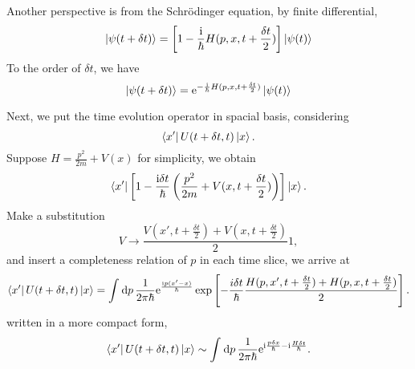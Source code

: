 Another perspective is from the Schr\"odinger equation, by finite differential,
\begin{equation}
  \ket{\psi(t+\delta t)} = \left[ 1- \frac{\mathrm{i} }{\hbar}H(p, x, t+ \frac{\delta t}{2}) \right] \ket{\psi(t)}
\end{equation}
To the order of $\delta t$, we have 
\begin{equation}
    \ket{\psi(t+\delta t)} = \mathrm{e}^{- \frac{\mathrm{i} }{\hbar}H(p,x,t+ \frac{\delta t}{2})} \ket{\psi(t)}
\end{equation}

Next, we put the time evolution operator in spacial basis, considering
\begin{equation}
  \bra{x'}U(t+\delta t,t)\ket{x}.
\end{equation}
Suppose $H = \frac{p^{2}}{2m}+ V(x)$ for simplicity, we obtain
\begin{equation}
  \bra{x'}\left[ 1- \frac{\mathrm{i}  \delta t}{\hbar}\left( \frac{p^{2}}{2m} + V(x, t+ \frac{\delta t}{2}) \right)  \right] \ket{x}.
\end{equation}
Make a substitution
\begin{equation}
  V \rightarrow \frac{V(x',t+ \frac{\delta t}{2})+ V(x, t+\frac{\delta t}{2})}{2} 1,
\end{equation}
and insert a completeness relation of $p$ in each time slice, we arrive at
\begin{equation}
    \bra{x'}U(t+\delta t,t)\ket{x} = \int_{}^{} \mathrm{d}p \, \frac{1}{2\pi\hbar} \mathrm{e}^{\frac{\mathrm{i} p(x'-x)}{\hbar}} \exp \left[ - \frac{i\delta t}{\hbar} \frac{H(p,x',t+ \frac{\delta t}{2})+H(p,x,t+ \frac{\delta t}{2})}{2} \right] .
\end{equation}
written in a more compact form,
\begin{equation}
    \bra{x'}U(t+\delta t,t)\ket{x} \sim \int_{}^{} \mathrm{d}p \, \frac{1}{2\pi\hbar} \mathrm{e}^{\mathrm{i} \frac{p \delta x}{\hbar}-\mathrm{i}  \frac{H \delta t}{\hbar}}. 
\end{equation}

